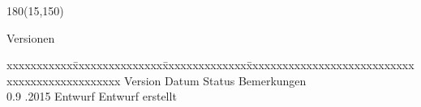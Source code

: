 \begin{textblock}{180}(15,150)
\color{black}
\begin{huge}
Versionen
\end{huge}
\vspace{10mm}

\fontsize{10pt}{18pt}\selectfont
\begin{tabbing}
xxxxxxxxxxx\=xxxxxxxxxxxxxxx\=xxxxxxxxxxxxxx\=xxxxxxxxxxxxxxxxxxxxxxxxxxxxxxxxxxxxxxxxxxxxxxx \kill
Version	\> Datum	\> Status		\> Bemerkungen		\\
0.9	.2015	\> Entwurf		\> Entwurf erstellt	\\	
\end{tabbing}

\end{textblock}
